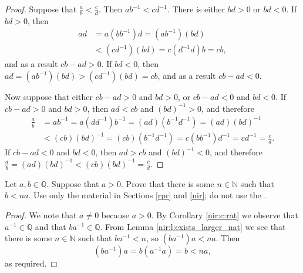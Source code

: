 \begin{proof}
	Suppose that $\frac{a}{b} < \frac{c}{d}$. Then $a b^{-1} < c d^{-1}$. There is either $b d > 0$ or $b d < 0$. If $b d > 0$, then
	\begin{align*}
		a d & = a (b b^{-1}) d = (a b^{-1})(b d)        \\
		    & < (c d^{-1})(b d) = c (d^{-1} d) b = c b,
	\end{align*}
	and as a result $c b - a d > 0$.
	If $b d < 0$, then $a d = (a b^{-1})(b d) > (c d^{-1})(b d) = c b$, and as a result $c b - a d < 0$.

	Now suppose that either $c b - a d > 0$ and $b d > 0$, or $c b - a d < 0$ and $b d < 0$. If $c b - a d > 0$ and $b d > 0$, then $a d < c b$ and $(b d)^{-1} > 0$, and therefore
	\begin{align*}
		\frac{a}{b} & = a b^{-1} = a (d d^{-1}) b^{-1} = (a d)(b^{-1} d^{-1}) = (a d)(b d)^{-1}                \\
		            & < (c b)(b d)^{-1} = (c b)(b^{-1} d^{-1}) = c (b b^{-1}) d^{-1} = c d^{-1} = \frac{c}{d}.
	\end{align*}
	If $c b - a d < 0$ and $b d < 0$, then $a d > c b$ and $(b d)^{-1} < 0$, and therefore $\frac{a}{b} = (a d)(b d)^{-1} < (c b)(b d)^{-1} = \frac{c}{d}$.
\end{proof}


\Newpage
\existsLargerNatL*

\begin{exercise} %
	Let $a, b \in \mathbb{Q}$. Suppose that $a > 0$. Prove that there is some $n \in \mathbb{N}$ such that $b < n a$. Use only the material in Sections \ref{rpr} and \ref{nir}; do not use the .
\end{exercise}

\begin{proof}
	We note that $a \neq 0$ because $a > 0$. By Corollary \ref{nir:c:rat} we observe that $a^{-1} \in \mathbb{Q}$ and that $b a^{-1} \in \mathbb{Q}$. From Lemma \ref{nir:l:exists_larger_nat} we see that there is some $n \in \mathbb{N}$ such that $b a^{-1} < n$, so $(b a^{-1}) a < n a$. Then
	$$
		(b a^{-1}) a = b (a^{-1} a) = b < n a,
	$$
	as required.
\end{proof}




